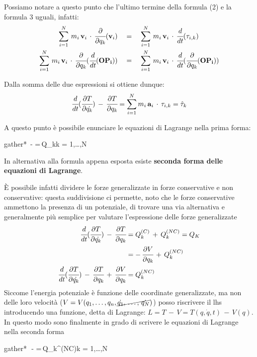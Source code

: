 Possiamo notare a questo punto che l'ultimo termine della formula (2) e la formula 3 uguali, infatti:
\begin{align*}
\sum_{i=1}^N\,m_i\,\mathbf{v}_i\,\cdot\,\cfrac{\partial}{\partial q_k}(\mathbf{v}_i)\quad &=\quad \sum_{i=1}^N\,m_i\,\mathbf{v}_i\,\cdot\,\cfrac{d}{dt}(\mathbf{\tau}_{i,k})\\
\sum_{i=1}^N\,m_i\,\mathbf{v}_i\,\cdot\,\cfrac{\partial}{\partial q_k}(\cfrac{d}{dt}(\mathbf{OP_i}))\quad &=\quad \sum_{i=1}^N\,m_i\,\mathbf{v}_i\,\cdot\,\cfrac{d}{dt}(\cfrac{\partial}{\partial q_k}(\mathbf{OP_i}))
\end{align*}

Dalla somma delle due espressioni si ottiene dunque:
\[\cfrac{d}{dt}(\cfrac{\partial T}{\partial\dot{q_k}})\,-\,\cfrac{\partial T}{\partial q_k} = \sum_{i=1}^N m_i\,\mathbf{a}_i\,\cdot\,\mathbf{\tau}_{i,k} = \hat{\tau}_k\]

A questo punto è possibile enunciare le equazioni di Lagrange nella prima forma:
\begin{empheq}[box=%
	\fbox]{gather*}
		\,-\,\,=\,Q_k\qquad\qquad k = 1,\dots,N
	\end{empheq}

In alternativa alla formula appena esposta esiste \textbf{seconda forma delle equazioni di Lagrange}.

È possibile infatti dividere le forze generalizzate in forze conservative e non conservative: questa suddivisione ci permette, noto che le forze conservative ammettono la presenza di un potenziale, di trovare una via alternativa e generalmente più semplice per valutare l'espressione delle forze generalizzate
\begin{align*}
\cfrac{d}{dt}(\cfrac{\partial T}{\partial\dot{q_k}})\,-\,\cfrac{\partial T}{\partial q_k}&= Q_k^{(C)}\,+\,Q_k^{(NC)} = Q_K\\
&= -\,\cfrac{\partial V}{\partial q_k}\,+\,Q_k^{(NC)}\\
\cfrac{d}{dt}(\cfrac{\partial T}{\partial\dot{q_k}})\,-\,\cfrac{\partial T}{\partial q_k}\,+\,\cfrac{\partial V}{\partial q_k} &=  Q_k^{(NC)}
\end{align*}
Siccome l'energia potenziale è funzione delle coordinate generalizzate, ma non delle loro velocità ($V = V(q_1,\dots,q_n,\cancel{\dot{q_1},\,\dots,\,\dot{q_N}})$) posso riscrivere il lhs introducendo una funzione, detta di Lagrange: $L = T\,-\,V=T(q,\dot{q},t)\,-\,V(q)$.
In questo modo sono finalmente in grado di scrivere le equazioni di Lagrange nella seconda forma
\begin{empheq}[box=%
	\fbox]{gather*}
		\,\,-\,\,=\,Q_k^{(NC)}\qquad\qquad k = 1,\dots,N
	\end{empheq}

